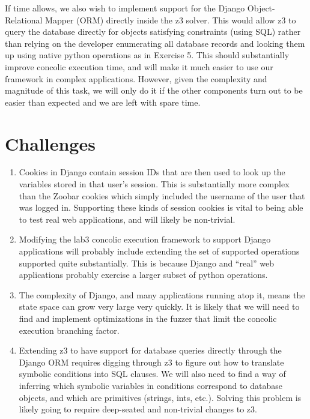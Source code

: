 \documentclass{scrartcl}
\begin{document}
If time allows, we also wish to implement support for the Django
Object-Relational Mapper (ORM) directly inside the z3 solver. This would allow
z3 to query the database directly for objects satisfying constraints (using
SQL) rather than relying on the developer enumerating all database records and
looking them up using native python operations as in Exercise 5. This should
substantially improve concolic execution time, and will make it much easier to
use our framework in complex applications. However, given the complexity and
magnitude of this task, we will only do it if the other components turn out to
be easier than expected and we are left with spare time.

\section{Challenges}
\begin{enumerate}
	\item Cookies in Django contain session IDs that are then used to look
		up the variables stored in that user's session. This is
		substantially more complex than the Zoobar cookies which simply
		included the username of the user that was logged in.
		Supporting these kinds of session cookies is vital to being
		able to test real web applications, and will likely be
		non-trivial.
	\item Modifying the lab3 concolic execution framework to support Django
		applications will probably include extending the set of
		supported operations supported quite substantially. This is
		because Django and ``real'' web applications probably exercise
		a larger subset of python operations.
	\item The complexity of Django, and many applications running atop it,
		means the state space can grow very large very quickly. It is
		likely that we will need to find and implement optimizations in
		the fuzzer that limit the concolic execution branching factor.
	\item Extending z3 to have support for database queries directly
		through the Django ORM requires digging through z3 to figure
		out how to translate symbolic conditions into SQL clauses.
		We will also need to find a way of inferring which symbolic
		variables in conditions correspond to database objects, and
		which are primitives (strings, ints, etc.). Solving this
		problem is likely going to require deep-seated and non-trivial
		changes to z3.
\end{enumerate}
\end{document}
